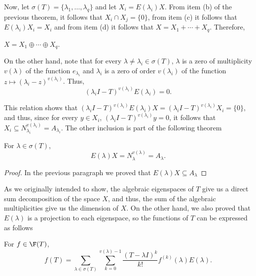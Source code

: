 Now, let $\sigma(T) = \{\lambda_1,\ldots, \lambda_q\}$ and let $X_i = E(\lambda_i) X$. From item (b) of the previous theorem, it follows that $X_i\cap X_j = \{0\}$, from item (c) it follows that $E(\lambda_i) X_i = X_i$ and from item (d) it follows that $X = X_1+\cdots + X_q$. Therefore,

\begin{corollary}
    $X = X_1 \oplus \cdots \oplus X_q $.
\end{corollary}

On the other hand, note that for every $\lambda \neq \lambda_i \in \sigma(T)$, $\lambda$ is a zero of multiplicity $v(\lambda)$ of the function $e_{\lambda_i}$ and $\lambda_i$ is a zero of order $v(\lambda_i)$ of the function $z \mapsto (\lambda_i - z)^{v(\lambda_i)}$. Thus,
\[ (\lambda_i I - T)^{v(\lambda_i)} E(\lambda_i) = 0. \]

This relation shows that $(\lambda_i I - T)^{v(\lambda_i)} E(\lambda_i)X = (\lambda_i I - T)^{v(\lambda_i)} X_i = \{0\}$, and thus, since for every $y \in X_i$, $(\lambda_i I - T)^{v(\lambda_i)} y = 0$, it follows that $X_i \subseteq N_{\lambda_i}^{v(\lambda_i)} = A_{\lambda_i}$. The other inclusion is part of the following theorem

\begin{theorem}
    For $\lambda \in \sigma(T)$,
    \[ E(\lambda)X = N_\lambda^{v(\lambda)} = A_\lambda. \]
\end{theorem}

\begin{proof}
    In the previous paragraph we proved that $E(\lambda)X \subseteq A_{\lambda}$
\end{proof}

As we originally intended to show, the algebraic eigenspaces of $T$ give us a direct sum decomposition of the space $X$, and thus, the sum of the algebraic multiplicities give us the dimension of $X$. On the other hand, we also proved that $E(\lambda)$ is a projection to each eigenspace, so the functions of $T$ can be expressed as follows

\begin{theorem}
    For $f \in \F(T)$,
    \[ f(T) = \sum_{\lambda \in \sigma(T)} \sum_{k = 0}^{v(\lambda)-1} \frac{(T-\lambda I)^k}{k!} f^{(k)}(\lambda) E(\lambda). \]
\end{theorem}